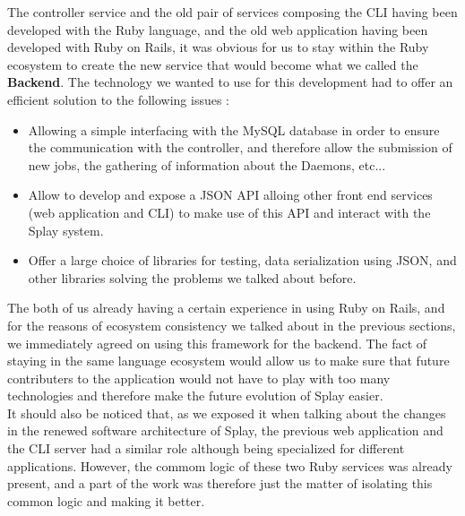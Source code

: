 \documentclass{eplmastersthesis}
\begin{document}
        The controller service and the old pair of services composing the CLI
        having been developed with the Ruby language, and the old web
        application having been developed with Ruby on Rails, it was obvious
        for us to stay within the Ruby ecosystem to create the new service
        that would become what we called the \textbf{Backend}. The technology
        we wanted to use for this development had to offer an efficient
        solution to the following issues :

        \begin{itemize}
          \item Allowing a simple interfacing with the MySQL database in order
          to ensure the communication with the controller, and therefore allow
          the submission of new jobs, the gathering of information about the
          Daemons, etc...
          \item Allow to develop and expose a JSON API alloing other front
          end services (web application and CLI) to make use of this API and
          interact with the Splay system.
          \item Offer a large choice of libraries for testing, data
          serialization using JSON, and other libraries solving the problems
          we talked about before.
        \end{itemize}

        The both of us already having a certain experience in using Ruby on
        Rails, and for the reasons of ecosystem consistency we talked about
        in the previous sections, we immediately agreed on using this
        framework for the backend. The fact of staying in the same language
        ecosystem would allow us to make sure that future contributers to
        the application would not have to play with too many technologies and
        therefore make the future evolution of Splay easier.\\
        It should also be noticed that, as we exposed it when talking about the
        changes in the renewed software architecture of Splay, the previous
        web application and the CLI server had a similar role although being
        specialized for different applications. However, the commom logic
        of these two Ruby services was already present, and a part of the
        work was therefore just the matter of isolating this common logic
        and making it better.\\
\end{document}
